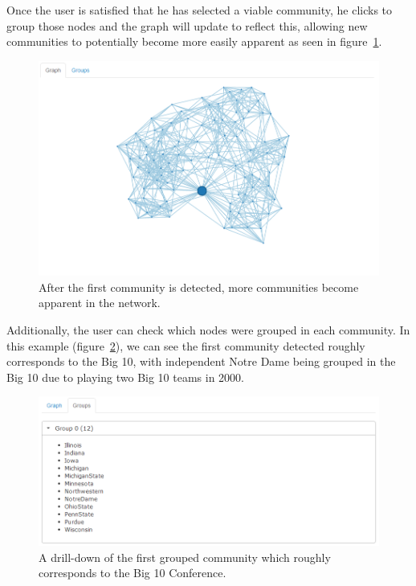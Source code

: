 \documentclass{article}\usepackage[]{graphicx}\usepackage[]{color}
\begin{document}
Once the user is satisfied that he has selected a viable community, he clicks to group those nodes and the graph will update to reflect this, allowing new communities to potentially become more easily apparent as seen in figure~\ref{fig:football_4}. 

\begin{figure}[H]
\centering
\includegraphics[width=\textwidth]{images/football_4.png}
\caption{\label{fig:football_4} After the first community is detected, more communities become apparent in the network.}
\end{figure}

Additionally, the user can check which nodes were grouped in each community. In this example (figure~\ref{fig:football_5}), we can see the first community detected roughly corresponds to the Big 10, with independent Notre Dame being grouped in the Big 10 due to playing two Big 10 teams in 2000.

\begin{figure}[H]
\centering
\includegraphics[width=\textwidth]{images/football_5.png}
\caption{\label{fig:football_5} A drill-down of the first grouped community which roughly corresponds to the Big 10 Conference.}
\end{figure}
\end{document}
